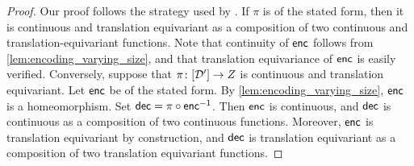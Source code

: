 \documentclass[12pt, twoside]{report}
\begin{document}
%

\begin{proof}
    Our proof follows the strategy used by \textcite{Zaheer:2017:Deep_Sets}.
    If $\pi$ is of the stated form, then it is continuous and translation equivariant as a composition of two continuous and translation-equivariant functions.
    Note that continuity of $\mathsf{enc}$ follows from \cref{lem:encoding_varying_size},
    and that translation equivariance of $\mathsf{enc}$ is easily verified.
    Conversely, suppose that $\pi \colon [\mathcal{D}'] \to Z$ is continuous and translation equivariant.
    Let $\mathsf{enc}$ be of the stated form.
    By \cref{lem:encoding_varying_size}, $\mathsf{enc}$ is a homeomorphism.
    Set $\mathsf{dec} = \pi \circ \mathsf{enc}^{-1}$.
    Then $\mathsf{enc}$ is continuous,
    and $\mathsf{dec}$ is continuous as a composition of two continuous functions.
    Moreover, $\mathsf{enc}$ is translation equivariant by construction, and $\mathsf{dec}$ is translation equivariant as a composition of two translation equivariant functions.
\end{proof}
\end{document}
